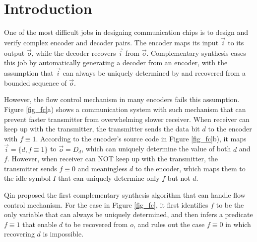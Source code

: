 \documentclass[conference]{IEEEtran}
\begin{document}
\section{Introduction}\label{sec_intro}
One of the most difficult jobs in designing communication
 chips is to design and verify complex encoder and decoder pairs.
The encoder maps its input $\vec{i}$ to its output  $\vec{o}$,
while the decoder recovers $\vec{i}$ from $\vec{o}$.
Complementary synthesis 
\cite{ShenICCAD09,ShenTCAD11,ShenTCAD12,LiuICCAD11,LiuTCAD12,TuDAC13}
eases this job by
automatically generating a decoder from an encoder,
with the assumption that $\vec{i}$ can always be
uniquely determined by and recovered from a bounded sequence of $\vec{o}$.

However,
the flow control mechanism \cite{flowcontrol} in many encoders
fails this assumption.
Figure \ref{fig_fc}a) shows a communication system with such mechanism 
that can prevent faster transmitter from overwhelming slower receiver.
When receiver can keep up with the transmitter,
the transmitter sends the data bit $d$ to the encoder with $f\equiv 1$.
According to the encoder's source code in Figure \ref{fig_fc}b),
it maps $\vec{i}=\{d,f\equiv 1\}$ to $\vec{o}=D_d$,
which can uniquely determine the value of both $d$ and $f$.
However,
when receiver can NOT keep up with the transmitter,
the transmitter sends $f\equiv 0$ and meaningless $d$ to the encoder,
which maps them to the idle symbol $I$ that can uniquely determine only $f$ but not $d$.

Qin\cite{QinTODAES15} proposed the first complementary synthesis algorithm 
that can handle flow control mechanism.
For the case in Figure \ref{fig_fc},
it first identifies $f$ to be the only variable that can always be uniquely determined,
and then infers a predicate $f\equiv 1$ that
enable $d$ to be recovered from $o$,
and rules out the case $f\equiv 0$ in which recovering $d$ is impossible.
\end{document}
